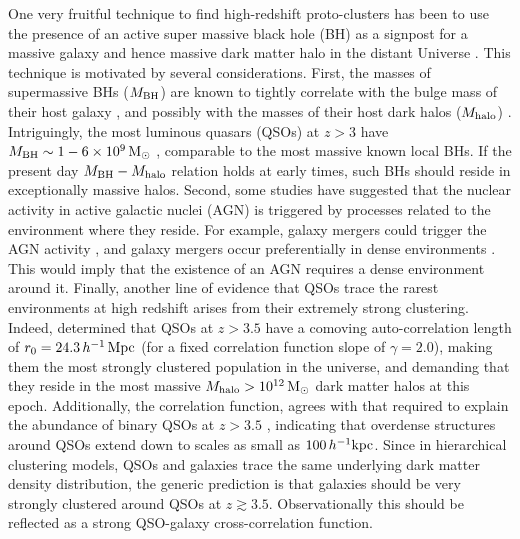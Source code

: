 \documentclass[iop, revtex4]{emulateapj}
\begin{document}
One very fruitful technique to find high-redshift proto-clusters has been to use the presence of an active super massive black hole (BH) as a signpost for a massive galaxy and hence massive
dark matter halo in the distant Universe
\citep[e.g.][]{Venemans07, Kashikawa07, Overzier08, Morselli14}. This
technique is motivated by several considerations. First, the masses of
supermassive BHs ($M_{\rm BH}$) are known to tightly correlate with the
bulge mass of their host galaxy \citep{Magorrian98, Ferrarese00, Gebhardt00}, 
and possibly 
with the
masses of their host dark halos ($M_{\rm halo}$) \citep[but see \citealt{Kormendy11}]{Ferrarese02}.
Intriguingly, the most luminous quasars (QSOs) at $z>3$ have $M_{\rm
  BH} \sim 1-6 \times 10^{9}\,\rm M_{\odot}$ \citep{Shen11},
comparable to the most massive known local BHs. If the
present day $M_{\rm BH} - M_{\rm halo}$ relation holds at early times,
such BHs should reside in exceptionally massive halos.  Second, some
studies have suggested that the nuclear activity in active galactic
nuclei (AGN) is triggered by processes related to the environment
where they reside. For example, galaxy mergers could trigger the AGN
activity \citep{Bahcall97, Wyithe02, Hennawi15}, and galaxy mergers occur
preferentially in dense environments \citep{Lacey93}. This would imply
that the existence of an AGN requires a dense environment around it.
Finally, another line of evidence that QSOs trace the rarest
environments at high redshift arises from their extremely strong
clustering. Indeed, \citet{Shen07} determined that QSOs at $z>3.5$
have a comoving auto-correlation length of $r_0=24.3\,h^{-1}\,{\rm Mpc}$
(for a fixed correlation function slope of $\gamma=2.0$),
making them the most strongly clustered population in the universe,
and demanding that they reside in the most massive $M_{\rm
  halo}>10^{12}\,\rm M_{\odot}$ dark matter halos at this epoch. Additionally,
the \citet{Shen07} correlation function, agrees with that required to
explain the abundance of binary QSOs at $z>3.5$
\citep{Hennawi10,Shen10}, indicating that overdense structures around
QSOs extend down to scales as small as $100\,h^{-1}\rm kpc$.
Since in hierarchical clustering models, QSOs and galaxies trace
the same underlying dark matter density distribution, the generic
prediction is that galaxies should be very strongly clustered around
QSOs at $z\gtrsim 3.5$. Observationally this should be reflected as a 
strong QSO-galaxy cross-correlation function.
\end{document}
